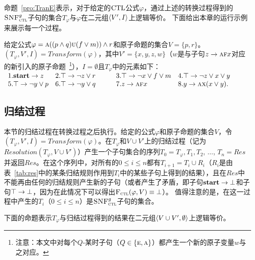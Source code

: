 命题~\ref{pro:TranE}表示，对于给定的$\textrm{CTL}$公式$\varphi$，通过上述的转换过程得到的${\textsc{SNF}_{\textsc{ctl}}^g}$子句的集合$T_{\varphi}$与$\varphi$在二元组${\langle{V',I}\rangle}$上逻辑等价。
下面给出本章的运行示例来展示每一个过程。

\begin{example}[运行示例]
	\label{examp:Tran}
	给定公式$\varphi=\textsc{a}((p\wedge q) \textsc{u} (f\vee m)) \wedge r$和原子命题的集合$V=\{p,r\}$。$(T_{\varphi}, V', I) = Transform(\varphi)$，其中$V'=\{x,y,z,w\}$（$w$是与子句$z \rightarrow \textsc{a} \textsc{f} x$对应的新引入的原子命题~\footnote{注意：本文中对每个$Q$-某时子句（$Q\in \{\textsc{e}, \textsc{a}\}$）都产生一个新的原子变量$w$与之对应。}），$I=\emptyset$且$T_{\varphi}$中的元素如下：\\
	$
	\begin{array}{llll}
		\centering
		1. \start\rto z & 2. \top \rto \neg z \vee r \qquad & 3.\top \rto \neg x\vee f \vee m  & 4. \top \rto \neg z \vee x \vee y \\
		5.\top \rto \neg y \vee p &  6.\top \rto \neg y \vee q &
		7. z \rto \ALL \FUTURE x & 8. y \rto \ALL \NEXT(x\vee y).\\
	\end{array}
	$
\end{example}



\subsection{归结过程}
本节的归结过程在转换过程之后执行。给定的公式$\varphi$和原子命题的集合$V$，令$(T_{\varphi}, V', I) = Transform(\varphi)$。在$T_{\varphi}$和$V\cup V'$上的归结过程（记为$Resolution(T_{\varphi}, V \cup V')$）产生一个子句集合的序列$T_0=T_{\varphi}, T_1, T_2$, $\dots$, $T_n=Res$并返回$Res$。在这个序列中，对所有的$0\leq i \leq n$都有$T_{i+1}=T_i\cup R_i$（$R_i$是由表~\ref{tab:res}中的某条归结规则作用到$T_i$中的某些子句上得到的结果），且在$Res$中不能再由任何的归结规则产生新的子句（或者产生了矛盾，即子句$\textbf{start}\rightarrow \bot$和子句$\top \rightarrow \bot$，因为在此情况下可以得出${\textsc{F}_{\textsc{ctl}}}(\varphi, V) \equiv \bot$）。
值得注意的是，在这一过程中产生的$T_i$（$0\leq i \leq n$）是${\textsc{SNF}_{\textsc{ctl}}^g}$子句的集合。

下面的命题表示$T_{\varphi}$与归结过程得到的结果在二元组${\langle{V\cup V',\emptyset}\rangle}$上逻辑等价。

